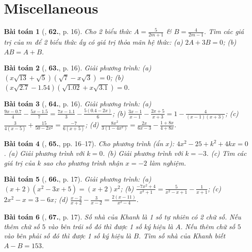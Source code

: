 \documentclass{article}
\numberwithin{equation}{section}
\newtheorem{baitoan}{Bài toán}
\begin{document}

\section{Miscellaneous}

\begin{baitoan}[\cite{SBT_Toan_8_tap_2}, \textbf{62.}, p. 16]
	Cho 2 biểu thức $A = \frac{5}{2m + 1}$ \& $B = \frac{4}{2m - 1}$. Tìm các giá trị của $m$ để 2 biểu thức ấy có giá trị thỏa mãn hệ thức: (a) $2A + 3B = 0$; (b) $AB = A + B$.
\end{baitoan}

\begin{baitoan}[\cite{SBT_Toan_8_tap_2}, \textbf{63.}, p. 16]
	Giải phương trình: (a) $(x\sqrt{13} + \sqrt{5})(\sqrt{7} - x\sqrt{3}) = 0$; (b) $(x\sqrt{2.7} - 1.54)(\sqrt{1.02} + x\sqrt{3.1}) = 0$.
\end{baitoan}

\begin{baitoan}[\cite{SBT_Toan_8_tap_2}, \textbf{64.}, p. 16]
	Giải phương trình: (a) $\frac{9x - 0.7}{4} - \frac{5x - 1.5}{7} = \frac{7x - 1.1}{3} - \frac{5(0.4 - 2x)}{6}$; (b) $\frac{3x - 1}{x - 1} - \frac{2x + 5}{x + 3} = 1 - \frac{4}{(x - 1)(x + 3)}$; (c) $\frac{3}{4(x - 5)} + \frac{15}{50 - 2x^2} = \frac{-7}{6(x + 5)}$; (d) $\frac{8x^2}{3(1 - 4x^2)} = \frac{2x}{6x - 3} - \frac{1 + 8x}{4 + 8x}$.
\end{baitoan}

\begin{baitoan}[\cite{SBT_Toan_8_tap_2}, \textbf{65.}, pp. 16--17]
	Cho phương trình (ẩn $x$): $4x^2 - 25 + k^2 + 4kx = 0$. (a) Giải phương trình với $k = 0$. (b) Giải phương trình với $k = -3$. (c) Tìm các giá trị của $k$ sao cho phương trình nhận $x = -2$ làm nghiệm.
\end{baitoan}

\begin{baitoan}[\cite{SBT_Toan_8_tap_2}, \textbf{66.}, p. 17]
	Giải phương trình: (a) $(x + 2)(x^2 - 3x + 5) = (x + 2)x^2$; (b) $\frac{-7x^2 + 4}{x^3 + 1} = \frac{5}{x^2 - x + 1} - \frac{1}{x + 1}$; (c) $2x^2 - x = 3 - 6x$; (d) $\frac{x - 2}{x + 2} - \frac{3}{x - 2} = \frac{2(x - 11)}{x^2 - 4}$.
\end{baitoan}

\begin{baitoan}[\cite{SBT_Toan_8_tap_2}, \textbf{67.}, p. 17]
	Số nhà của Khanh là 1 số tự nhiên có 2 chữ số. Nếu thêm chữ số $5$ vào bên trái số đó thì được 1 số ký hiệu là $A$. Nếu thêm chữ số $5$ vào bên phải số đó thì được 1 số ký hiệu là $B$. Tìm số nhà của Khanh biết $A - B = 153$.
\end{baitoan}
\end{document}
